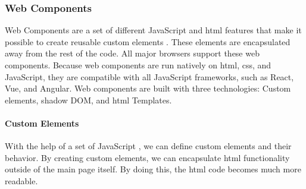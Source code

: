 




\subsubsection{Web Components}%
\label{sub:Web Components}
Web Components are a set of different JavaScript  and \acrshort{html} features that make it possible to create reusable custom elements \cite{WebComponentsMDN}. These elements are encapsulated away from the rest of the code. All major browsers support these web components. Because web components are run natively on \acrshort{html}, \acrshort{css}, and JavaScript, they are compatible with all JavaScript frameworks, such as React, Vue, and Angular. Web components are built with three technologies: Custom elements, shadow DOM, and \acrshort{html} Templates. 

\paragraph{Custom Elements}
With the help of a set of JavaScript , we can define custom elements and their behavior. By creating custom elements, we can encapsulate \acrshort{html} functionality outside of the main page itself. By doing this, the \acrshort{html} code becomes much more readable. 

